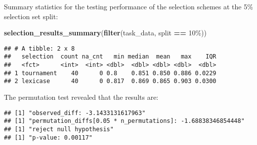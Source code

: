 \documentclass[
]{book}
\newenvironment{Shaded}{\begin{snugshade}}{\end{snugshade}}
\newcommand{\AttributeTok}[1]{\textcolor[rgb]{0.13,0.29,0.53}{#1}}
\newcommand{\DecValTok}[1]{\textcolor[rgb]{0.00,0.00,0.81}{#1}}
\newcommand{\FunctionTok}[1]{\textcolor[rgb]{0.13,0.29,0.53}{\textbf{#1}}}
\newcommand{\NormalTok}[1]{#1}
\newcommand{\OtherTok}[1]{\textcolor[rgb]{0.56,0.35,0.01}{#1}}
\newcommand{\SpecialCharTok}[1]{\textcolor[rgb]{0.81,0.36,0.00}{\textbf{#1}}}
\newcommand{\StringTok}[1]{\textcolor[rgb]{0.31,0.60,0.02}{#1}}
\begin{document}
Summary statistics for the testing performance of the selection schemes at the 5\% selection set split:

\begin{Shaded}
\begin{Highlighting}[]
\FunctionTok{selection\_results\_summary}\NormalTok{(}\FunctionTok{filter}\NormalTok{(task\_data, split }\SpecialCharTok{==} \StringTok{\textquotesingle{}10\%\textquotesingle{}}\NormalTok{))}
\end{Highlighting}
\end{Shaded}

\begin{verbatim}
## # A tibble: 2 x 8
##   selection  count na_cnt   min median  mean   max    IQR
##   <fct>      <int>  <int> <dbl>  <dbl> <dbl> <dbl>  <dbl>
## 1 tournament    40      0 0.8    0.851 0.850 0.886 0.0229
## 2 lexicase      40      0 0.817  0.869 0.865 0.903 0.0300
\end{verbatim}

The permutation test revealed that the results are:

\begin{Shaded}
\end{Shaded}

\begin{verbatim}
## [1] "observed_diff: -3.1433131617963"
## [1] "permutation_diffs[0.05 * n_permutations]: -1.68838346854448"
## [1] "reject null hypothesis"
## [1] "p-value: 0.00117"
\end{verbatim}
\end{document}
